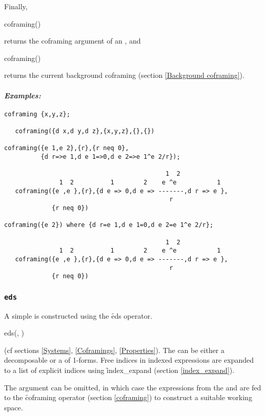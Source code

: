 Finally,
\begin{edssyntax}
	coframing()
\end{edssyntax}
returns the coframing argument of an , and
\begin{edssyntax}
	coframing()
\end{edssyntax}
returns the current background coframing (section \ref{Background
coframing}).

\paragraph{\it Examples:}
\begin{verbatim}
coframing {x,y,z};

   coframing({d x,d y,d z},{x,y,z},{},{})

coframing({e 1,e 2},{r},{r neq 0},
          {d r=>e 1,d e 1=>0,d e 2=>e 1^e 2/r});

                                            1  2
               1  2          1        2    e ^e           1
   coframing({e ,e },{r},{d e => 0,d e => -------,d r => e },
                                             r 
             {r neq 0})

coframing({e 2}) where {d r=e 1,d e 1=0,d e 2=e 1^e 2/r};

                                            1  2
               1  2          1        2    e ^e           1
   coframing({e ,e },{r},{d e => 0,d e => -------,d r => e },
                                             r 
             {r neq 0})
\end{verbatim}

\subsubsection{\tt eds}
\label{eds}

A simple  is constructed using the \f{eds} operator.
\begin{edssyntax}
	eds(,\ignorespaces
	)
\end{edssyntax}
(cf sections \ref{Systems}, \ref{Coframings}, \ref{Properties}). The
 can be either a decomposable  or a
 of 1-forms. Free indices in indexed expressions are expanded
to a list of explicit indices using \f{index\_expand} (section
\ref{index_expand}).

The  argument can be omitted, in which case the expressions
from the  and  are fed to the
\f{coframing} operator (section \ref{coframing}) to construct a suitable
working space.

